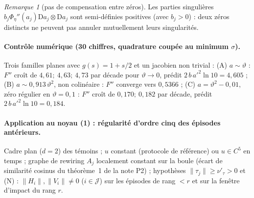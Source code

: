 \documentclass[11pt,a4paper]{article}
\theoremstyle{remark}
\newtheorem{remarque}[theoreme]{Remarque}
\newcommand{\vth}{\vartheta}
\newcommand{\D}{\mathrm D}
\begin{document}
\begin{remarque}[pas de compensation entre zéros]
Les parties singulières $b_j\Phi_\eta''(a_j)\D a_j\otimes\D a_j$ sont semi-définies positives (avec $b_j>0$) : deux zéros distincts ne peuvent pas annuler mutuellement leurs singularités.
\end{remarque}

\paragraph{Contrôle numérique (30 chiffres, quadrature coupée au minimum $\sigma$).} Trois familles planes avec $g(s)=1+s/2$ et un jacobien non trivial : (A) $a\sim\vth$ : $F''$ croît de $4{,}61;\ 4{,}63;\ 4{,}73$ par décade pour $\vth\to0$, prédit $2\,b\,a'^2\ln10=4{,}605$ ; (B) $a\sim0{,}913\,\vth^2$, non colinéaire : $F''$ converge vers $0{,}5366$ ; (C) $a=\vth^2-0{,}01$, zéro régulier en $\vth=0{,}1$ : $F''$ croît de $0{,}170;\ 0{,}182$ par décade, prédit $2\,b\,a'^2\ln10=0{,}184$.

\paragraph{Application au noyau (1) : régularité d'ordre cinq des épisodes antérieurs.} Cadre plan ($d=2$) des témoins ; $u$ constant (protocole de référence) ou $u\in C^5$ en temps ; graphe de rewiring $A_j$ localement constant sur la boule (écart de similarité cosinus du théorème~1 de la note P2) ; hypothèses $\lVert\tau_j\rVert\ge\nu'_\tau>0$ et (N) : $\lVert H_i\rVert,\lVert V_i\rVert\ne0$ ($i\in\mathcal J$) sur les épisodes de rang $<r$ et sur la fenêtre d'impact du rang $r$.
\end{document}
